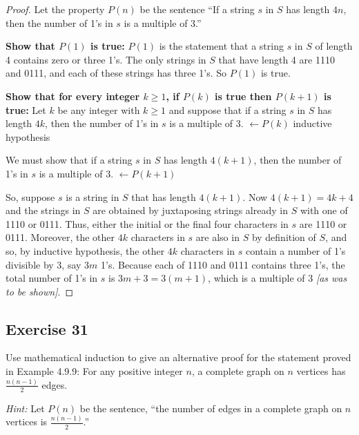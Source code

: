 \documentclass[14pt]{extarticle}
\newcommand{\from}{\leftarrow}
\newcommand{\cy}{\color{cyan}}
\begin{document}
\begin{proof}
Let the property $P(n)$ be the sentence “If a string $s$ in $S$ has length $4n$, then the number of 1’s in $s$ is a multiple of 3.” 

{\bf Show that $P(1)$ is true:} $P(1)$ is the statement that a string $s$ in $S$ of length 4 contains zero or three  1’s. The only strings in $S$ that have length 4 are 1110 and 0111, and each of these strings has three 1’s. So $P(1)$ is true.

{\bf Show that for every integer $k \geq 1$, if $P(k)$ is true then $P(k + 1)$ is true:} Let $k$ be any integer with $k \geq 1$ and suppose that if a string $s$ in $S$ has length $4k$, then the number of 1’s in $s$ is a multiple of 3. {\cy $\from P(k)$ inductive hypothesis}

We must show that if a string $s$ in $S$ has length $4(k + 1)$, then the number of 1’s in $s$ is a multiple of 3. {\cy $\from P(k + 1)$} 

So, suppose $s$ is a string in $S$ that has length $4(k + 1)$. Now $4(k + 1) = 4k + 4$ and the strings in $S$ are obtained by juxtaposing strings already in $S$ with one of 1110 or 0111. Thus, either the initial or the final four characters in $s$ are 1110 or 0111. Moreover, the other $4k$ characters in $s$ are also in $S$ by definition of $S$, and so, by inductive hypothesis, the other $4k$ characters in $s$ contain a number of 1's divisible by 3, say $3m$ 1’s. Because each of 1110 and 0111 contains three 1’s, the total number of 1’s in $s$ is $3m + 3 = 3(m+1)$, which is a multiple of 3 {\it [as was to be shown]}. 
\end{proof}

\subsection{Exercise 31}
Use mathematical induction to give an alternative proof for the statement proved in Example 4.9.9: For any positive integer $n$, a complete graph on $n$ vertices has $\frac{n(n - 1)}{2}$ edges. 

{\it Hint:} Let $P(n)$ be the sentence, ``the number of edges in a complete graph on $n$ vertices is $\frac{n(n - 1)}{2}$.''
\end{document}
